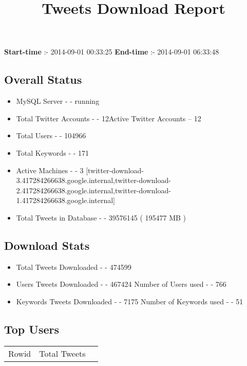 \documentclass{article}\usepackage[T1]{fontenc}
\begin{document}
\title{\textbf{Tweets Download Report}}
               \date{}
                \maketitle
               \centerline{\textbf{Start-time} :- 2014-09-01 00:33:25 \hspace{40pt} \textbf{End-time} :- 2014-09-01 06:33:48}               \subsection*{Overall Status}                \begin{itemize}                \item MySQL Server - - running               \item Total Twitter Accounts - - 12\newline Active Twitter Accounts -- 12               \item Total Users - - 104966               \item Total Keywords - - 171               \item Active Machines - - 3 [twitter-download-3.417284266638.google.internal,twitter-download-2.417284266638.google.internal,twitter-download-1.417284266638.google.internal]               \item Total Tweets in Database - - 39576145 ( 195477 MB )               \end{itemize}               \subsection*{Download Stats}                \begin{itemize}                \item Total Tweets Downloaded - - 474599               \item Users Tweets Downloaded - - 467424 \newline Number of Users used - - 766               \item Keywords Tweets Downloaded - - 7175 \newline Number of Keywords used - - 51              \end{itemize}              \subsection*{Top Users}\begin{tabular}{|c|c|c|}         \hline         Rowid & Total Tweets \\ 

\end{tabular}
\end{document}
